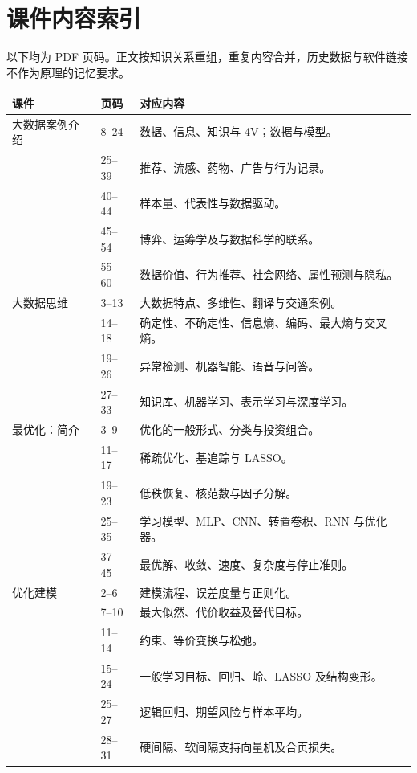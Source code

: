 \documentclass[UTF8,fontset=fandol,a4paper,12pt]{ctexart}
\theoremstyle{definition}
\begin{document}
\section{课件内容索引}
以下均为 PDF 页码。正文按知识关系重组，重复内容合并，历史数据与软件链接不作为原理的记忆要求。
\begin{longtable}{p{}p{}p{}}
\toprule
课件 & 页码 & 对应内容\\
\midrule
\endhead
大数据案例介绍 & 8--24 & 数据、信息、知识与 4V；数据与模型。\\
 & 25--39 & 推荐、流感、药物、广告与行为记录。\\
 & 40--44 & 样本量、代表性与数据驱动。\\
 & 45--54 & 博弈、运筹学及与数据科学的联系。\\
 & 55--60 & 数据价值、行为推荐、社会网络、属性预测与隐私。\\
\midrule
大数据思维 & 3--13 & 大数据特点、多维性、翻译与交通案例。\\
 & 14--18 & 确定性、不确定性、信息熵、编码、最大熵与交叉熵。\\
 & 19--26 & 异常检测、机器智能、语音与问答。\\
 & 27--33 & 知识库、机器学习、表示学习与深度学习。\\
\midrule
最优化：简介 & 3--9 & 优化的一般形式、分类与投资组合。\\
 & 11--17 & 稀疏优化、基追踪与 LASSO。\\
 & 19--23 & 低秩恢复、核范数与因子分解。\\
 & 25--35 & 学习模型、MLP、CNN、转置卷积、RNN 与优化器。\\
 & 37--45 & 最优解、收敛、速度、复杂度与停止准则。\\
\midrule
优化建模 & 2--6 & 建模流程、误差度量与正则化。\\
 & 7--10 & 最大似然、代价收益及替代目标。\\
 & 11--14 & 约束、等价变换与松弛。\\
 & 15--24 & 一般学习目标、回归、岭、LASSO 及结构变形。\\
 & 25--27 & 逻辑回归、期望风险与样本平均。\\
 & 28--31 & 硬间隔、软间隔支持向量机及合页损失。\\
\bottomrule
\end{longtable}
\end{document}
